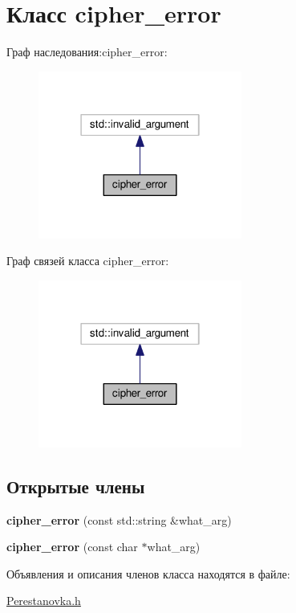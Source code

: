 \hypertarget{classcipher__error}{}\section{Класс cipher\+\_\+error}
\label{classcipher__error}


Граф наследования\+:cipher\+\_\+error\+:\nopagebreak
\begin{figure}[H]
\begin{center}
\leavevmode
\includegraphics[width=190pt]{classcipher__error__inherit__graph}
\end{center}
\end{figure}


Граф связей класса cipher\+\_\+error\+:\nopagebreak
\begin{figure}[H]
\begin{center}
\leavevmode
\includegraphics[width=190pt]{classcipher__error__coll__graph}
\end{center}
\end{figure}
\subsection*{Открытые члены}
\begin{DoxyCompactItemize}
\item 
{\bfseries cipher\+\_\+error} (const std\+::string \&what\+\_\+arg)\hypertarget{classcipher__error_aac662e216a84bfeb873303c7b88d029e}{}\label{classcipher__error_aac662e216a84bfeb873303c7b88d029e}

\item 
{\bfseries cipher\+\_\+error} (const char $\ast$what\+\_\+arg)\hypertarget{classcipher__error_a18cf27d9c2cd2538d3cb8f17e9a55f3e}{}\label{classcipher__error_a18cf27d9c2cd2538d3cb8f17e9a55f3e}

\end{DoxyCompactItemize}


Объявления и описания членов класса находятся в файле\+:\begin{DoxyCompactItemize}
\item 
\hyperlink{Perestanovka_8h}{Perestanovka.\+h}\end{DoxyCompactItemize}
